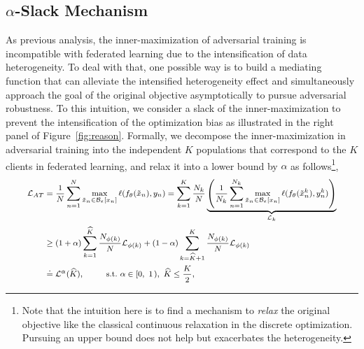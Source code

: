 \documentclass{article} %
\newcommand{\bx}{{x}}
\newcommand{\epsball}{\mathcal{B}_\epsilon}
\newcommand{\xadv}{\tilde{{x}}}
\theoremstyle{plain}
\theoremstyle{definition}
\theoremstyle{remark}
\begin{document}
\subsection{\texorpdfstring{$\alpha$}{a}-Slack Mechanism}
\label{sec:theo_analysis}

As previous analysis, the inner-maximization of adversarial training is incompatible with federated learning due to the intensification of data heterogeneity. To deal with that, one possible way is to build a mediating function that can alleviate the intensified heterogeneity effect and simultaneously approach the goal of the original objective asymptotically to pursue adversarial robustness.
To this intuition, we consider a slack of the inner-maximization to prevent the intensification of the optimization bias as illustrated in the right panel of Figure~\ref{fig:reason}. Formally, we decompose the inner-maximization in adversarial training into the independent $K$ populations that correspond to the $K$ clients in federated learning, and relax it into a lower bound by $\alpha$ as follows\footnote{Note that the intuition here is to find a mechanism to \emph{relax} the original objective like the classical continuous relaxation in the discrete optimization. Pursuing an upper bound does not help but exacerbates the heterogeneity.},
\begin{align} \label{eq:alpha-weighted-loss}
\vspace{-4mm}
\footnotesize
    \begin{split}
        \mathcal{L}_{AT} &= \frac{1}{N}\sum_{n=1}^N \max_{\xadv_n\in\epsball[\bx_n]} \ell(f_\theta(\xadv_n), y_n)
     = \sum_{k=1}^K \frac{N_k}{N}\underbrace{\left(\frac{1}{N_k}\sum_{n=1}^{N_k}\max_{\xadv_n\in\epsball[\bx_n]}\ell(f_\theta(\xadv_n^k), y_n^k)\right)}_{\mathcal{L}_k} \\
        & \geq (1+\alpha) \sum_{k=1}^{\widehat{K}} \frac{N_{\phi(k)}}{N}\mathcal{L}_{\phi(k)} + (1-\alpha) \sum_{k=\widehat{K}+1}^{K} \frac{N_{\phi(k)}}{N}\mathcal{L}_{\phi(k)}~\quad \\
        & \doteq \mathcal{L}^\alpha(\widehat{K}),  ~\quad~\quad \text{s.t.}~\alpha\in\left[0,~1\right.),~\widehat{K}\leq \frac{K}{2},
    \end{split}
    \vspace{-6mm}
\end{align}
\end{document}
